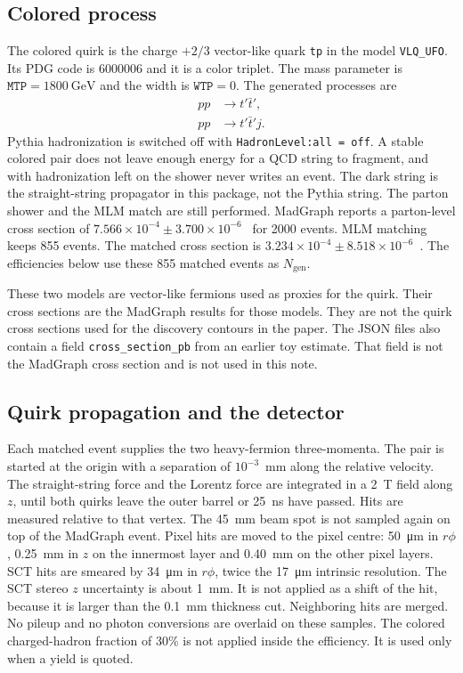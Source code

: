 \documentclass[11pt,a4paper]{article}
\begin{document}
\subsection{Colored process}
The colored quirk is the charge \(+2/3\) vector-like quark \texttt{tp} in the model \texttt{VLQ\_UFO}.
Its PDG code is 6000006 and it is a color triplet.
The mass parameter is \(\texttt{MTP} = \SI{1800}{\GeV}\) and the width is \(\texttt{WTP} = 0\).
The generated processes are
\begin{align*}
p p &\to t' \bar t', \\
p p &\to t' \bar t' j.
\end{align*}
Pythia hadronization is switched off with \texttt{HadronLevel:all = off}.
A stable colored pair does not leave enough energy for a QCD string to fragment, and with hadronization left on the shower never writes an event.
The dark string is the straight-string propagator in this package, not the Pythia string.
The parton shower and the MLM match are still performed.
MadGraph reports a parton-level cross section of
\(7.566\times 10^{-4} \pm 3.700\times 10^{-6}\)~\si{\pb}
for 2000 events.
MLM matching keeps 855 events.
The matched cross section is
\(3.234\times 10^{-4} \pm 8.518\times 10^{-6}\)~\si{\pb}.
The efficiencies below use these 855 matched events as \(N_{\mathrm{gen}}\).

These two models are vector-like fermions used as proxies for the quirk.
Their cross sections are the MadGraph results for those models.
They are not the quirk cross sections used for the discovery contours in the paper.
The JSON files also contain a field \texttt{cross\_section\_pb} from an earlier toy estimate.
That field is not the MadGraph cross section and is not used in this note.

\subsection{Quirk propagation and the detector}
Each matched event supplies the two heavy-fermion three-momenta.
The pair is started at the origin with a separation of \(10^{-3}\)~\si{\mm} along the relative velocity.
The straight-string force and the Lorentz force are integrated in a \SI{2}{\tesla} field along \(z\), until both quirks leave the outer barrel or \SI{25}{\ns} have passed.
Hits are measured relative to that vertex.
The \SI{45}{\mm} beam spot is not sampled again on top of the MadGraph event.
Pixel hits are moved to the pixel centre: \SI{50}{\micro\metre} in \(r\phi\), \SI{0.25}{\mm} in \(z\) on the innermost layer and \SI{0.40}{\mm} on the other pixel layers.
SCT hits are smeared by \SI{34}{\micro\metre} in \(r\phi\), twice the \SI{17}{\micro\metre} intrinsic resolution.
The SCT stereo \(z\) uncertainty is about \SI{1}{\mm}.
It is not applied as a shift of the hit, because it is larger than the \SI{0.1}{\mm} thickness cut.
Neighboring hits are merged.
No pileup and no photon conversions are overlaid on these samples.
The colored charged-hadron fraction of 30\% is not applied inside the efficiency.
It is used only when a yield is quoted.
\end{document}
